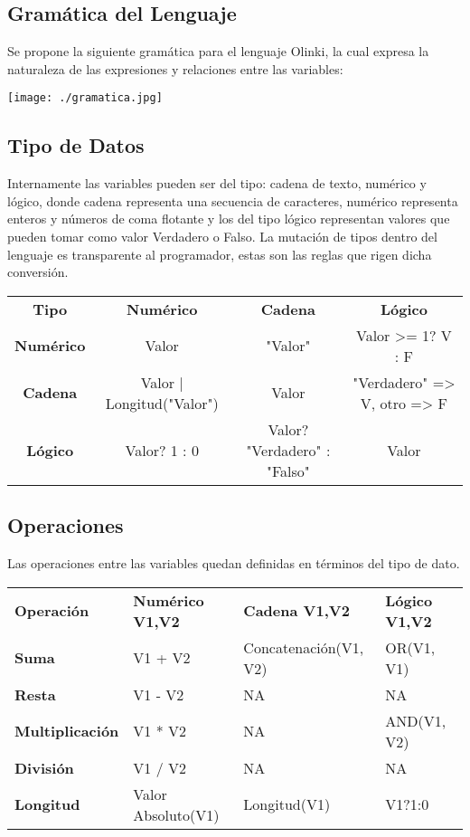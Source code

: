 \documentclass[letterpaper,10pt]{article}
\begin{document}
\subsection{Gramática del Lenguaje}


Se propone la siguiente gramática para el lenguaje Olinki, la cual expresa la naturaleza de las expresiones y relaciones entre las variables:
\begin{center}
 \texttt{[image: ./gramatica.jpg]}
\end{center}


\subsection{Tipo de Datos}

Internamente las variables pueden ser del tipo: cadena de texto, numérico y lógico, donde cadena representa una secuencia de caracteres, 
numérico representa enteros y números de coma flotante y los del tipo lógico representan valores que pueden tomar como valor Verdadero o Falso.
La mutación de tipos dentro del lenguaje es transparente al programador, estas son las reglas que rigen dicha conversión.

\begin{center}
\begin{tabular}{cccc}
\textbf{Tipo} & \textbf{Numérico} & \textbf{Cadena} & \textbf{Lógico}\\
\textbf{Numérico} & Valor & "Valor" & Valor >= 1? V : F\\
\textbf{Cadena} & Valor | Longitud("Valor") & Valor & "Verdadero" => V, otro => F\\
\textbf{Lógico} & Valor? 1 : 0 & Valor? "Verdadero" : "Falso" & Valor
\end{tabular}
\end{center}


\subsection{Operaciones}


Las operaciones entre las variables quedan definidas en términos del tipo de dato.

\begin{center}
\begin{tabular}{llll}
\textbf{Operación} & \textbf{Numérico V1,V2} & \textbf{Cadena V1,V2} & \textbf{Lógico V1,V2}\\
\textbf{Suma} & V1 + V2 & Concatenación(V1, V2) & OR(V1, V1)\\
\textbf{Resta} & V1 - V2 & NA & NA\\
\textbf{Multiplicación} & V1 * V2 & NA & AND(V1, V2)\\
\textbf{División} & V1 / V2 & NA & NA\\
\textbf{Longitud} & Valor Absoluto(V1) & Longitud(V1) & V1?1:0
\end{tabular}
\end{center}
\end{document}
